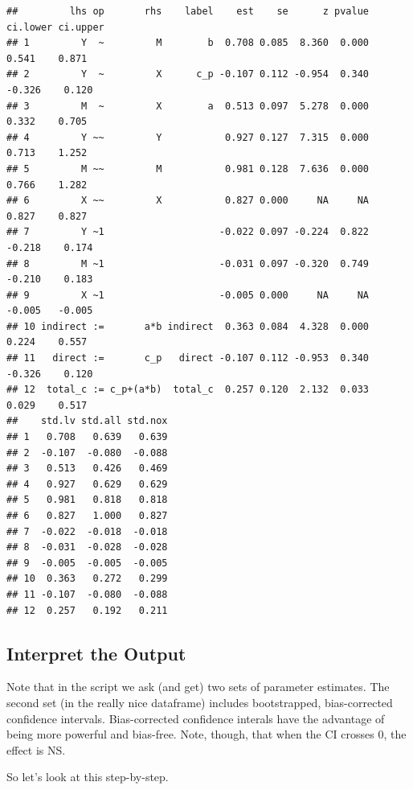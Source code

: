 \documentclass[
  11pt,
]{book}
\begin{document}
\begin{verbatim}
##         lhs op       rhs    label    est    se      z pvalue ci.lower ci.upper
## 1         Y  ~         M        b  0.708 0.085  8.360  0.000    0.541    0.871
## 2         Y  ~         X      c_p -0.107 0.112 -0.954  0.340   -0.326    0.120
## 3         M  ~         X        a  0.513 0.097  5.278  0.000    0.332    0.705
## 4         Y ~~         Y           0.927 0.127  7.315  0.000    0.713    1.252
## 5         M ~~         M           0.981 0.128  7.636  0.000    0.766    1.282
## 6         X ~~         X           0.827 0.000     NA     NA    0.827    0.827
## 7         Y ~1                    -0.022 0.097 -0.224  0.822   -0.218    0.174
## 8         M ~1                    -0.031 0.097 -0.320  0.749   -0.210    0.183
## 9         X ~1                    -0.005 0.000     NA     NA   -0.005   -0.005
## 10 indirect :=       a*b indirect  0.363 0.084  4.328  0.000    0.224    0.557
## 11   direct :=       c_p   direct -0.107 0.112 -0.953  0.340   -0.326    0.120
## 12  total_c := c_p+(a*b)  total_c  0.257 0.120  2.132  0.033    0.029    0.517
##    std.lv std.all std.nox
## 1   0.708   0.639   0.639
## 2  -0.107  -0.080  -0.088
## 3   0.513   0.426   0.469
## 4   0.927   0.629   0.629
## 5   0.981   0.818   0.818
## 6   0.827   1.000   0.827
## 7  -0.022  -0.018  -0.018
## 8  -0.031  -0.028  -0.028
## 9  -0.005  -0.005  -0.005
## 10  0.363   0.272   0.299
## 11 -0.107  -0.080  -0.088
## 12  0.257   0.192   0.211
\end{verbatim}

\hypertarget{interpret-the-output}{%
\subsection{Interpret the Output}\label{interpret-the-output}}

Note that in the script we ask (and get) two sets of parameter estimates. The second set (in the really nice dataframe) includes bootstrapped, bias-corrected confidence intervals. Bias-corrected confidence interals have the advantage of being more powerful and bias-free. Note, though, that when the CI crosses 0, the effect is NS.

So let's look at this step-by-step.
\end{document}
